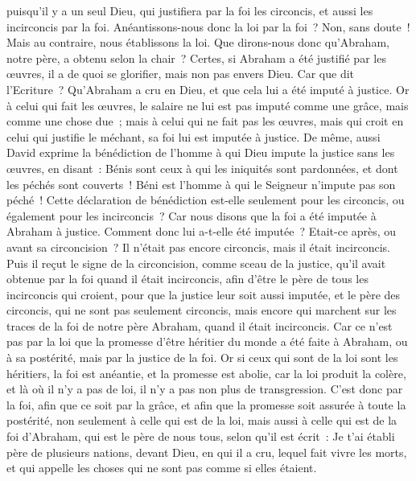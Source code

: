 \begin{multicols}{2}
puisqu'il y a un seul Dieu, qui justifiera par la foi les circoncis, et aussi les incirconcis par la foi.
Anéantissons-nous donc la loi par la foi~? Non, sans doute~! Mais au contraire, nous établissons la loi.
\VerseOne{}Que dirons-nous donc qu'Abraham, notre père, a obtenu selon la chair~?
Certes, si Abraham a été justifié par les œuvres, il a de quoi se glorifier, mais non pas envers Dieu.
Car que dit l'Ecriture~? Qu'Abraham a cru en Dieu, et que cela lui a été imputé à justice.
Or à celui qui fait les œuvres, le salaire ne lui est pas imputé comme une grâce, mais comme une chose due~;
mais à celui qui ne fait pas les œuvres, mais qui croit en celui qui justifie le méchant, sa foi lui est imputée à justice.
De même, aussi David exprime la bénédiction de l'homme à qui Dieu impute la justice sans les œuvres, en disant~:
Bénis sont ceux à qui les iniquités sont pardonnées, et dont les péchés sont couverts~!
Béni est l'homme à qui le Seigneur n'impute pas son péché~!
Cette déclaration de bénédiction est-elle seulement pour les circoncis, ou également pour les incirconcis~? Car nous disons que la foi a été imputée à Abraham à justice.
Comment donc lui a-t-elle été imputée~? Etait-ce après, ou avant sa circoncision~? Il n'était pas encore circoncis, mais il était incirconcis.
Puis il reçut le signe de la circoncision, comme sceau de la justice, qu'il avait obtenue par la foi quand il était incirconcis, afin d'être le père de tous les incirconcis qui croient, pour que la justice leur soit aussi imputée,
et le père des circoncis, qui ne sont pas seulement circoncis, mais encore qui marchent sur les traces de la foi de notre père Abraham, quand il était incirconcis.
Car ce n'est pas par la loi que la promesse d'être héritier du monde a été faite à Abraham, ou à sa postérité, mais par la justice de la foi.
Or si ceux qui sont de la loi sont les héritiers, la foi est anéantie, et la promesse est abolie,
car la loi produit la colère, et là où il n'y a pas de loi, il n'y a pas non plus de transgression.
C'est donc par la foi, afin que ce soit par la grâce, et afin que la promesse soit assurée à toute la postérité, non seulement à celle qui est de la loi, mais aussi à celle qui est de la foi d'Abraham, qui est le père de nous tous,
selon qu'il est écrit~: Je t'ai établi père de plusieurs nations, devant Dieu, en qui il a cru, lequel fait vivre les morts, et qui appelle les choses qui ne sont pas comme si elles étaient.

\end{multicols}
